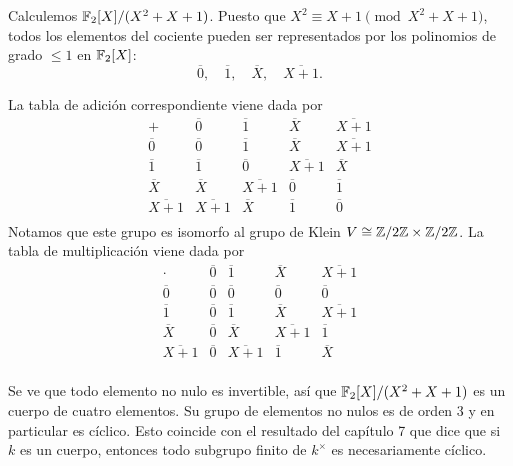 \begin{ejemplo}
  Calculemos $\mathbb{F}_2 [X] / (X^2 + X + 1)$. Puesto que
  $X^2 \equiv X + 1 \pmod{X^2 + X + 1}$, todos los elementos del cociente pueden
  ser representados por los polinomios de grado $\le 1$ en $\mathbb{F}_2 [X]$:
  \[ \overline{0}, \quad \overline{1}, \quad
    \overline{X}, \quad \overline{X + 1}. \]

  La tabla de adición correspondiente viene dada por
    \[ \begin{array}{c|cccc}
         + & \overline{0} & \overline{1} & \overline{X} & \overline{X + 1} \\
         \hline
         \overline{0} & \overline{0} & \overline{1} & \overline{X} & \overline{X+1} \\
         \overline{1} & \overline{1} & \overline{0} & \overline{X + 1} & \overline{X} \\
         \overline{X} & \overline{X} & \overline{X + 1} & \overline{0} & \overline{1} \\
         \overline{X + 1} & \overline{X + 1} & \overline{X} & \overline{1} & \overline{0} \\
       \end{array} \]
  Notamos que este grupo es isomorfo al grupo de Klein
  $V \cong \mathbb{Z}/2\mathbb{Z} \times \mathbb{Z}/2\mathbb{Z}$.
  La tabla de multiplicación viene dada por
     \[ \begin{array}{c|cccc}
          \cdot & \overline{0} & \overline{1} & \overline{X} & \overline{X + 1} \\
          \hline
          \overline{0} & \overline{0} & \overline{0} & \overline{0} & \overline{0} \\
          \overline{1} & \overline{0} & \overline{1} & \overline{X} & \overline{X + 1} \\
          \overline{X} & \overline{0} & \overline{X } & \overline{X + 1} & \overline{1} \\
          \overline{X + 1} & \overline{0} & \overline{X + 1} & \overline{1} & \overline{X} \\
        \end{array} \]

  Se ve que todo elemento no nulo es invertible, así que
  $\mathbb{F}_2 [X] / (X^2 + X + 1)$ es un cuerpo de cuatro elementos. Su grupo
  de elementos no nulos es de orden $3$ y en particular es cíclico. Esto
  coincide con el resultado del capítulo 7 que dice que si $k$ es un cuerpo,
  entonces todo subgrupo finito de $k^\times$ es necesariamente cíclico.
\end{ejemplo}

